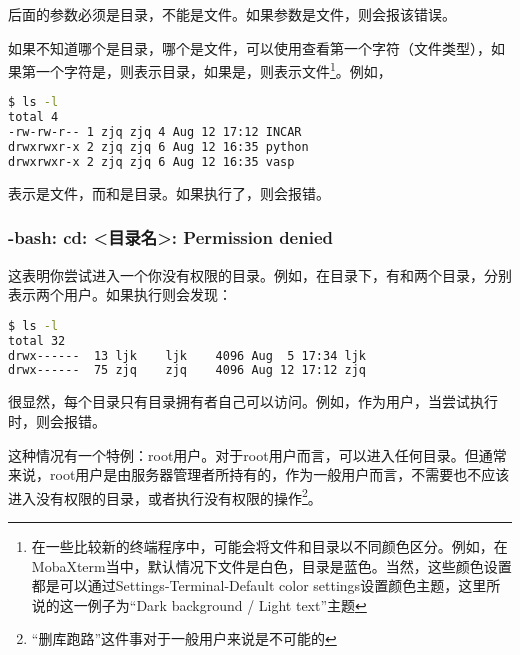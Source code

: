 后面的参数必须是目录，不能是文件。如果参数是文件，则会报该错误。

如果不知道哪个是目录，哪个是文件，可以使用查看第一个字符（文件类型），如果第一个字符是，则表示目录，如果是\code{-}，则表示文件\footnote{在一些比较新的终端程序中，可能会将文件和目录以不同颜色区分。例如，在MobaXterm当中，默认情况下文件是白色，目录是蓝色。当然，这些颜色设置都是可以通过Settings-Terminal-Default color settings设置颜色主题，这里所说的这一例子为“Dark background / Light text”主题}。例如，

\begin{lstlisting}[language=bash]
$ ls -l
total 4
-rw-rw-r-- 1 zjq zjq 4 Aug 12 17:12 INCAR
drwxrwxr-x 2 zjq zjq 6 Aug 12 16:35 python
drwxrwxr-x 2 zjq zjq 6 Aug 12 16:35 vasp
\end{lstlisting}

表示是文件，而和是目录。如果执行了，则会报错。

\subsubsection{-bash: cd: <目录名>: Permission denied}

这表明你尝试进入一个你没有权限的目录。例如，在目录下，有和两个目录，分别表示两个用户。如果执行则会发现：

\begin{lstlisting}[language=bash]
$ ls -l
total 32
drwx------  13 ljk    ljk    4096 Aug  5 17:34 ljk
drwx------  75 zjq    zjq    4096 Aug 12 17:12 zjq
\end{lstlisting}

很显然，每个目录只有目录拥有者自己可以访问。例如，作为用户，当尝试执行时，则会报错。

\begin{extend}
    这种情况有一个特例：root用户。对于root用户而言，可以进入任何目录。但通常来说，root用户是由服务器管理者所持有的，作为一般用户而言，不需要也不应该进入没有权限的目录，或者执行没有权限的操作\footnote{“删库跑路”这件事对于一般用户来说是不可能的}。
\end{extend}